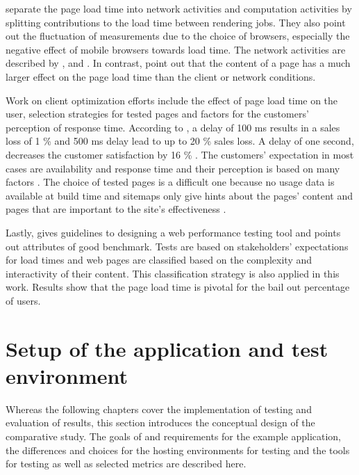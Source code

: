 \documentclass[a4paper, 12pt]{article}
\begin{document}
\cite{whatifanalysis} separate the page load time into network activities and computation activities by splitting contributions to the load time between rendering jobs.
They also point out the fluctuation of measurements due to the choice of browsers, especially the negative effect of mobile browsers towards load time.
The network activities are described by \cite{webprophet}, \cite{highperformancebrowsernetworking} and \cite{measuringandmitigatinwebperformance}.
In contrast, \cite{effectsofwebpagecontents} point out that the content of a page has a much larger effect on the page load time than the client or network conditions. 

Work on client optimization efforts include the effect of page load time on the user, selection strategies for tested pages and factors for the customers' perception of response time.
According to \cite{webprophet}, a delay of 100 ms results in a sales loss of 1 \% and 500 ms delay lead to up to 20 \% sales loss.
A delay of one second, decreases the customer satisfaction by 16 \% \citep{effectsofwebpagecontents}.
The customers' expectation in most cases are availability and response time and their perception is based on many factors \citep{loadtestingofwebsites}.
The choice of tested pages is a difficult one because no usage data is available at build time and sitemaps only give hints about the pages' content and pages that are important to the site's effectiveness \citep{onlandingandinternalwebpages}. 

Lastly, \cite{integratedapproach} gives guidelines to designing a web performance testing tool and points out attributes of good benchmark.
Tests are based on stakeholders' expectations for load times and web pages are classified based on the complexity and interactivity of their content.
This classification strategy is also applied in this work.
Results show that the page load time is pivotal for the bail out percentage of users.

\section{Setup of the application and test environment}\label{sec:design}

Whereas the following chapters cover the implementation of testing and evaluation of results, this section introduces the conceptual design of the comparative study.
The goals of and requirements for the example application, the differences and choices for the hosting environments for testing and the tools for testing as well as selected metrics are described here.
\end{document}
